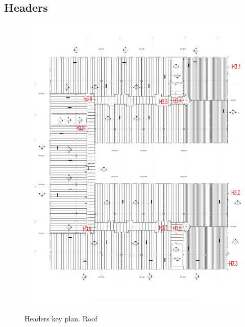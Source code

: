 \subsection{Headers}

\begin{figure}
  \begin{center}
  \includegraphics[width=120mm]{figures/headers_key_plan_roof}
  \end{center}
  \caption{Headers key plan. Roof}\label{fg_headers_key_plan_roof}
\end{figure}

